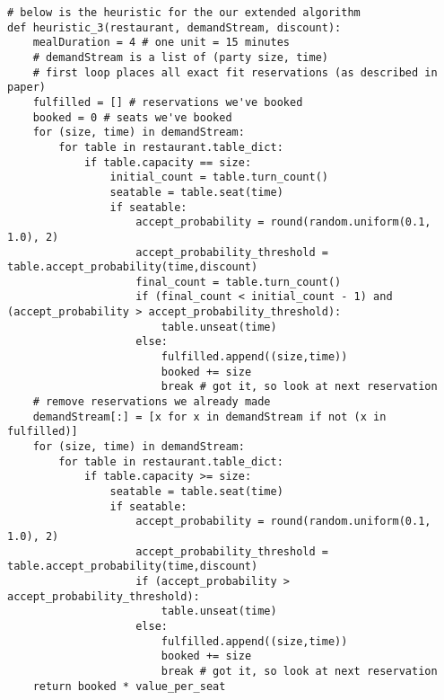 \documentclass[12pt, titlepage]{article}
\begin{document}
\begin{Verbatim}[fontsize=\scriptsize]
# below is the heuristic for the our extended algorithm
def heuristic_3(restaurant, demandStream, discount):
    mealDuration = 4 # one unit = 15 minutes
    # demandStream is a list of (party size, time)
    # first loop places all exact fit reservations (as described in paper)
    fulfilled = [] # reservations we've booked
    booked = 0 # seats we've booked
    for (size, time) in demandStream:
        for table in restaurant.table_dict:
            if table.capacity == size:
                initial_count = table.turn_count()
                seatable = table.seat(time)
                if seatable:
                    accept_probability = round(random.uniform(0.1, 1.0), 2)
                    accept_probability_threshold = table.accept_probability(time,discount)
                    final_count = table.turn_count()
                    if (final_count < initial_count - 1) and (accept_probability > accept_probability_threshold):
                        table.unseat(time)
                    else:
                        fulfilled.append((size,time))
                        booked += size
                        break # got it, so look at next reservation
    # remove reservations we already made
    demandStream[:] = [x for x in demandStream if not (x in fulfilled)]
    for (size, time) in demandStream:
        for table in restaurant.table_dict:
            if table.capacity >= size:
                seatable = table.seat(time)
                if seatable:
                    accept_probability = round(random.uniform(0.1, 1.0), 2)
                    accept_probability_threshold = table.accept_probability(time,discount)
                    if (accept_probability > accept_probability_threshold):
                        table.unseat(time)
                    else:
                        fulfilled.append((size,time))
                        booked += size
                        break # got it, so look at next reservation
    return booked * value_per_seat


\end{Verbatim}
\end{document}
